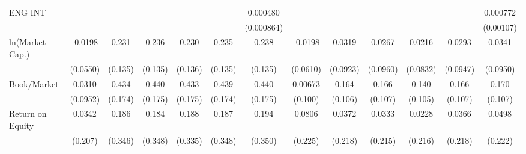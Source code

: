 {\begin{tabular}{l*{12}{c}}
ENG INT             &                     &                     &                     &                     &                     &    0.000480         &                     &                     &                     &                     &                     &    0.000772         \\
                    &                     &                     &                     &                     &                     &  (0.000864)         &                     &                     &                     &                     &                     &   (0.00107)         \\
ln(Market Cap.)     &     -0.0198         &       0.231\sym{*}  &       0.236\sym{*}  &       0.230\sym{*}  &       0.235\sym{*}  &       0.238\sym{*}  &     -0.0198         &      0.0319         &      0.0267         &      0.0216         &      0.0293         &      0.0341         \\
                    &    (0.0550)         &     (0.135)         &     (0.135)         &     (0.136)         &     (0.135)         &     (0.135)         &    (0.0610)         &    (0.0923)         &    (0.0960)         &    (0.0832)         &    (0.0947)         &    (0.0950)         \\
Book/Market         &      0.0310         &       0.434\sym{**} &       0.440\sym{**} &       0.433\sym{**} &       0.439\sym{**} &       0.440\sym{**} &     0.00673         &       0.164         &       0.166         &       0.140         &       0.166         &       0.170         \\
                    &    (0.0952)         &     (0.174)         &     (0.175)         &     (0.175)         &     (0.174)         &     (0.175)         &     (0.100)         &     (0.106)         &     (0.107)         &     (0.105)         &     (0.107)         &     (0.107)         \\
Return on Equity    &      0.0342         &       0.186         &       0.184         &       0.188         &       0.187         &       0.194         &      0.0806         &      0.0372         &      0.0333         &      0.0228         &      0.0366         &      0.0498         \\
                    &     (0.207)         &     (0.346)         &     (0.348)         &     (0.335)         &     (0.348)         &     (0.350)         &     (0.225)         &     (0.218)         &     (0.215)         &     (0.216)         &     (0.218)         &     (0.222)         \\

\end{tabular}}
